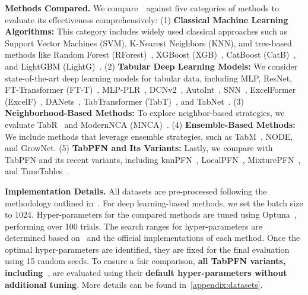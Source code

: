 \textbf{Methods Compared.} We compare~\name~against five categories of methods to evaluate its effectiveness comprehensively:
(1) \textbf{Classical Machine Learning Algorithms:} This category includes widely used classical approaches such as Support Vector Machines (SVM), K-Nearest Neighbors (KNN), and tree-based methods like Random Forest (RForest)~\cite{Breiman01RandomForest}, XGBoost (XGB)~\cite{chen2016xgboost}, CatBoost (CatB)~\cite{Prokhorenkova2018Catboost}, and LightGBM (LightG)~\cite{ke2017lightgbm}.
(2) \textbf{Tabular Deep Learning Models:} We consider state-of-the-art deep learning models for tabular data, including MLP, ResNet, FT-Transformer (FT-T)~\cite{GorishniyRKB21Revisiting}, MLP-PLR~\cite{Gorishniy2022On}, DCNv2~\cite{WangSCJLHC21DCNv2}, AutoInt~\cite{SongS0DX0T19AutoInt}, SNN~\cite{KlambauerUMH17SNN}, ExcelFormer (ExcelF)~\cite{Chen2023Excel}, DANets~\cite{ChenLWCW22DAN}, TabTransformer (TabT)~\cite{Huang2020TabTransformer}, and TabNet~\cite{ArikP21TabNet}.
(3) \textbf{Neighborhood-Based Methods:} To explore neighbor-based strategies, we evaluate TabR~\cite{gorishniy2023tabr} and ModernNCA (MNCA)~\cite{Ye2024ModernNCA}.
(4) \textbf{Ensemble-Based Methods:} We include methods that leverage ensemble strategies, such as TabM~\cite{Yury2024TabM}, NODE, and GrowNet.
(5) \textbf{TabPFN and Its Variants:} Lastly, we compare with TabPFN and its recent variants, including knnPFN~\cite{LocalPFN}, LocalPFN~\cite{LocalPFN}, MixturePFN~\cite{MixturePFN}, and TuneTables~\cite{TuneTables}. 

\textbf{Implementation Details.} All datasets are pre-processed following the methodology outlined in~\citet{GorishniyRKB21Revisiting}. For deep learning-based methods, we set the batch size to 1024. Hyper-parameters for the compared methods are tuned using Optuna~\cite{akiba2019optuna}, performing over 100 trials. The search ranges for hyper-parameters are determined based on~\citet{GorishniyRKB21Revisiting,TALENT} and the official implementations of each method. Once the optimal hyper-parameters are identified, they are fixed for the final evaluation using 15 random seeds. 
To ensure a fair comparison, \textbf{all TabPFN variants, including~\name}, are evaluated using their \textbf{default hyper-parameters without additional tuning}. More details can be found in~\autoref{appendix:datasets}. 


